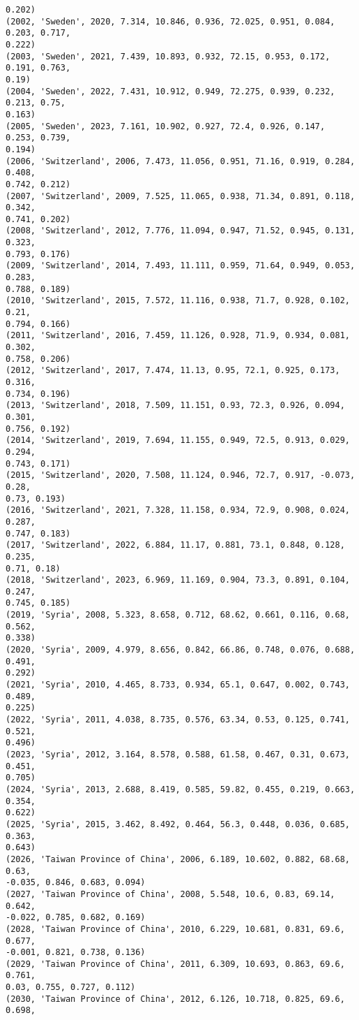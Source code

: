 \documentclass[11pt]{article}
\begin{document}
\begin{Verbatim}[commandchars=\\\{\}]
0.202)
(2002, 'Sweden', 2020, 7.314, 10.846, 0.936, 72.025, 0.951, 0.084, 0.203, 0.717,
0.222)
(2003, 'Sweden', 2021, 7.439, 10.893, 0.932, 72.15, 0.953, 0.172, 0.191, 0.763,
0.19)
(2004, 'Sweden', 2022, 7.431, 10.912, 0.949, 72.275, 0.939, 0.232, 0.213, 0.75,
0.163)
(2005, 'Sweden', 2023, 7.161, 10.902, 0.927, 72.4, 0.926, 0.147, 0.253, 0.739,
0.194)
(2006, 'Switzerland', 2006, 7.473, 11.056, 0.951, 71.16, 0.919, 0.284, 0.408,
0.742, 0.212)
(2007, 'Switzerland', 2009, 7.525, 11.065, 0.938, 71.34, 0.891, 0.118, 0.342,
0.741, 0.202)
(2008, 'Switzerland', 2012, 7.776, 11.094, 0.947, 71.52, 0.945, 0.131, 0.323,
0.793, 0.176)
(2009, 'Switzerland', 2014, 7.493, 11.111, 0.959, 71.64, 0.949, 0.053, 0.283,
0.788, 0.189)
(2010, 'Switzerland', 2015, 7.572, 11.116, 0.938, 71.7, 0.928, 0.102, 0.21,
0.794, 0.166)
(2011, 'Switzerland', 2016, 7.459, 11.126, 0.928, 71.9, 0.934, 0.081, 0.302,
0.758, 0.206)
(2012, 'Switzerland', 2017, 7.474, 11.13, 0.95, 72.1, 0.925, 0.173, 0.316,
0.734, 0.196)
(2013, 'Switzerland', 2018, 7.509, 11.151, 0.93, 72.3, 0.926, 0.094, 0.301,
0.756, 0.192)
(2014, 'Switzerland', 2019, 7.694, 11.155, 0.949, 72.5, 0.913, 0.029, 0.294,
0.743, 0.171)
(2015, 'Switzerland', 2020, 7.508, 11.124, 0.946, 72.7, 0.917, -0.073, 0.28,
0.73, 0.193)
(2016, 'Switzerland', 2021, 7.328, 11.158, 0.934, 72.9, 0.908, 0.024, 0.287,
0.747, 0.183)
(2017, 'Switzerland', 2022, 6.884, 11.17, 0.881, 73.1, 0.848, 0.128, 0.235,
0.71, 0.18)
(2018, 'Switzerland', 2023, 6.969, 11.169, 0.904, 73.3, 0.891, 0.104, 0.247,
0.745, 0.185)
(2019, 'Syria', 2008, 5.323, 8.658, 0.712, 68.62, 0.661, 0.116, 0.68, 0.562,
0.338)
(2020, 'Syria', 2009, 4.979, 8.656, 0.842, 66.86, 0.748, 0.076, 0.688, 0.491,
0.292)
(2021, 'Syria', 2010, 4.465, 8.733, 0.934, 65.1, 0.647, 0.002, 0.743, 0.489,
0.225)
(2022, 'Syria', 2011, 4.038, 8.735, 0.576, 63.34, 0.53, 0.125, 0.741, 0.521,
0.496)
(2023, 'Syria', 2012, 3.164, 8.578, 0.588, 61.58, 0.467, 0.31, 0.673, 0.451,
0.705)
(2024, 'Syria', 2013, 2.688, 8.419, 0.585, 59.82, 0.455, 0.219, 0.663, 0.354,
0.622)
(2025, 'Syria', 2015, 3.462, 8.492, 0.464, 56.3, 0.448, 0.036, 0.685, 0.363,
0.643)
(2026, 'Taiwan Province of China', 2006, 6.189, 10.602, 0.882, 68.68, 0.63,
-0.035, 0.846, 0.683, 0.094)
(2027, 'Taiwan Province of China', 2008, 5.548, 10.6, 0.83, 69.14, 0.642,
-0.022, 0.785, 0.682, 0.169)
(2028, 'Taiwan Province of China', 2010, 6.229, 10.681, 0.831, 69.6, 0.677,
-0.001, 0.821, 0.738, 0.136)
(2029, 'Taiwan Province of China', 2011, 6.309, 10.693, 0.863, 69.6, 0.761,
0.03, 0.755, 0.727, 0.112)
(2030, 'Taiwan Province of China', 2012, 6.126, 10.718, 0.825, 69.6, 0.698,

\end{Verbatim}
\end{document}
